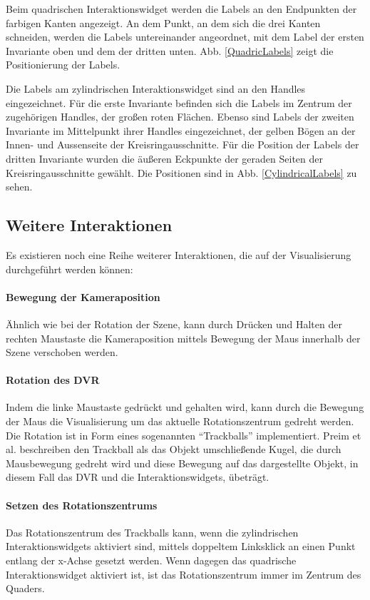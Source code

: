 \documentclass[a4paper,fontsize=12pt,toc=bib,halfparskip]{scrartcl}
\begin{document}
Beim quadrischen Interaktionswidget werden die Labels an den Endpunkten der farbigen Kanten angezeigt. An dem Punkt, an dem sich die drei Kanten schneiden, werden die Labels untereinander angeordnet, mit dem Label der ersten Invariante oben und dem der dritten unten. Abb. \ref{QuadricLabels} zeigt die Positionierung der Labels.

Die Labels am zylindrischen Interaktionswidget sind an den Handles eingezeichnet. F\"ur die erste Invariante befinden sich die Labels im Zentrum der zugeh\"origen Handles, der gro{\ss}en roten Fl\"achen. Ebenso sind Labels der zweiten Invariante im Mittelpunkt ihrer Handles eingezeichnet, der gelben B\"ogen an der Innen- und Aussenseite der Kreisringausschnitte. F\"ur die Position der Labels der dritten Invariante wurden die \"au{\ss}eren Eckpunkte der geraden Seiten der Kreisringausschnitte gew\"ahlt. Die Positionen sind in Abb. \ref{CylindricalLabels} zu sehen.

\subsection{Weitere Interaktionen}
Es existieren noch eine Reihe weiterer Interaktionen, die auf der Visualisierung durchgef\"uhrt werden k\"onnen:
\paragraph{Bewegung der Kameraposition}
\"Ahnlich wie bei der Rotation der Szene, kann durch Dr\"ucken und Halten der rechten Maustaste die Kameraposition mittels Bewegung der Maus innerhalb der Szene verschoben werden.
\paragraph{Rotation des DVR}
Indem die linke Maustaste gedr\"uckt und gehalten wird, kann durch die Bewegung der Maus die Visualisierung um das aktuelle Rotationszentrum gedreht werden. Die Rotation ist in Form eines sogenannten ``Trackballs'' implementiert. Preim et al. beschreiben den Trackball als das Objekt umschlie{\ss}ende Kugel, die durch Mausbewegung gedreht wird und diese Bewegung auf das dargestellte Objekt, in diesem Fall das DVR und die Interaktionswidgets, \"ubetr\"agt.
\paragraph{Setzen des Rotationszentrums}
Das Rotationszentrum des Trackballs kann, wenn die zylindrischen Interaktionswidgets aktiviert sind, mittels doppeltem Linksklick an einen Punkt entlang der x-Achse gesetzt werden. Wenn dagegen das quadrische Interaktionswidget aktiviert ist, ist das Rotationszentrum immer im Zentrum des Quaders.
\end{document}
